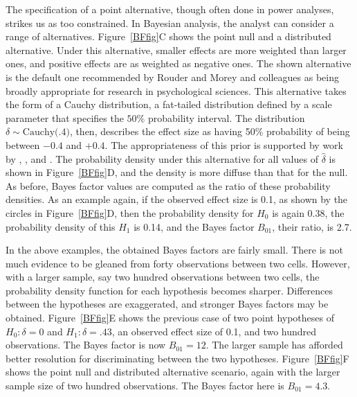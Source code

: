\documentclass[man]{apa6}
\begin{document}
The specification of a point alternative, though often done in power analyses, strikes us as too constrained.  In Bayesian analysis, the analyst can consider a range of alternatives.  Figure~\ref{BFfig}C shows the point null and a distributed alternative.  Under this alternative, smaller effects are more weighted than larger ones, and positive effects are as weighted as negative ones.  The shown alternative is the default one recommended by Rouder and Morey and colleagues \citep{Rouder:etal:2009a,Morey:Rouder:2011,Rouder:Morey:2012,Rouder:etal:2012} as being broadly appropriate for research in psychological sciences. This alternative takes the form of a Cauchy distribution, a fat-tailed distribution defined by a scale parameter that specifies the $50\%$ probability interval. The distribution $\delta \sim \mbox{Cauchy(.4)}$, then, describes the effect size as having 50\% probability of being between $-0.4$ and $+0.4$. 
The appropriateness of this prior is supported by work by \citet{Jeffreys:1961}, \citet{Liang:etal:2008}, and \citet{Zellner:Siow:1980}. 
The probability density under this alternative for all values of $\hat{\delta}$ is shown in Figure~\ref{BFfig}D, and the density is more diffuse than that for the null. As before, Bayes factor values are computed as the ratio of these probability densities. As an example again, if the observed effect size is 0.1, as shown by the circles in Figure~\ref{BFfig}D, then the probability density for $H_0$ is again 0.38, the probability density of this $H_1$ is 0.14, and the Bayes factor $B_{01}$, their ratio, is 2.7.

In the above examples, the obtained Bayes factors are fairly small. There is not much evidence to be gleaned from forty observations between two cells. However, with a larger sample, say two hundred observations between two cells, the probability density function for each hypothesis becomes sharper. Differences between the hypotheses are exaggerated, and stronger Bayes factors may be obtained. Figure~\ref{BFfig}E shows the previous case of two point hypotheses of $H_0: \delta = 0$ and $H_1: \delta = .43$, an observed effect size of 0.1, and two hundred observations. The Bayes factor is now $B_{01} = 12$. The larger sample has afforded better resolution for discriminating between the two hypotheses. Figure~\ref{BFfig}F shows the point null and distributed alternative scenario, again with the larger sample size of two hundred observations. The Bayes factor here is $B_{01} = 4.3$.
\end{document}
